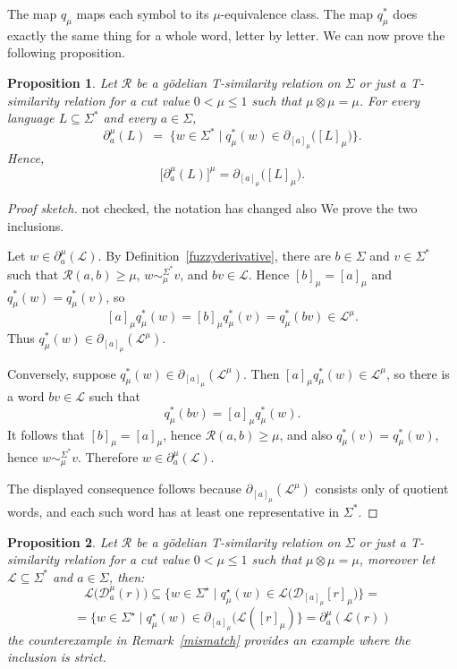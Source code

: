 \documentclass{article}
\newcommand{\cR}{{\mathcal R}}
\def\cut{\mu}
\newtheorem{proposition}{Proposition}[section]
\begin{document}
\noindent
The map $q_\cut$ maps each symbol to its $\cut$-equivalence class. The map
$q_\cut^*$ does exactly the same thing for a whole word, letter by letter. We can now prove the following proposition.



\begin{proposition}\label{the:quotient-fuzzy-derivative}
Let $\cR$ be a g\"odelian T-similarity relation on $\Sigma$ or just a T-similarity relation for a cut value $0 < \cut \le 1$ such that $\mu\otimes\mu=\mu$. For every language $L \subseteq \Sigma^*$ and every
$a\in\Sigma$,
\[
  \partial_a^\cut( L)
  \;=\;
  \{w\in\Sigma^* \mid q_\cut^*(w)\in
       \partial_{[a]_\cut}\bigl( [L]_\cut \bigr)\}.
\]
Hence,
\[
  \bigl[\partial_a^\cut( L)\bigr]^\mu
  =
  \partial_{[a]_\cut}\bigl( [L]_\cut \bigr).
\]
\end{proposition}

\begin{proof}[Proof sketch]{\color{red} not checked, the notation has changed also}
We prove the two inclusions.

Let $w\in\partial_a^\cut(\mathcal L)$. By Definition~\ref{fuzzyderivative},
there are $b\in\Sigma$ and $v\in\Sigma^*$ such that $\cR(a,b)\ge\cut$,
$w\sim_\cut^{\Sigma^*}v$, and $bv\in\mathcal L$. Hence
$[b]_\cut=[a]_\cut$ and $q_\cut^*(w)=q_\cut^*(v)$, so
\[
  [a]_\cut q_\cut^*(w)
  =
  [b]_\cut q_\cut^*(v)
  =
  q_\cut^*(bv)
  \in \mathcal L^\cut.
\]
Thus $q_\cut^*(w)\in\partial_{[a]_\cut}(\mathcal L^\cut)$.

Conversely, suppose $q_\cut^*(w)\in\partial_{[a]_\cut}(\mathcal L^\cut)$. Then
$[a]_\cut q_\cut^*(w)\in\mathcal L^\cut$, so there is a word $bv\in\mathcal L$
such that
\[
  q_\cut^*(bv)=[a]_\cut q_\cut^*(w).
\]
It follows that $[b]_\cut=[a]_\cut$, hence $\cR(a,b)\ge\cut$, and also
$q_\cut^*(v)=q_\cut^*(w)$, hence $w\sim_\cut^{\Sigma^*}v$. Therefore
$w\in\partial_a^\cut(\mathcal L)$.

The displayed consequence follows because
$\partial_{[a]_\cut}(\mathcal L^\cut)$ consists only of quotient words, and each
such word has at least one representative in $\Sigma^*$.
\end{proof}

{\color{red}\begin{proposition} 
Let $\cR$ be a g\"odelian T-similarity relation on $\Sigma$ or just a T-similarity relation for a cut value $0 < \cut \le 1$ such that $\mu\otimes\mu=\mu$, moreover let $\mathcal{L}\subseteq\Sigma^*$ and $a\in\Sigma$, then:
\[
 \mathcal L\bigl(\mathcal D_a^\cut( r)\bigr)
  \subseteq
 \{w\in \Sigma^\star \mid q^\star_\mu(w)\in \mathcal L\bigl(\mathcal D_{[a]_\cut} [r]_\mu\bigr)\}= \]
\[=\{w\in \Sigma^\star \mid q^\star_\mu(w)\in \partial_{[a]_\mu}(\mathcal L([r]_\mu)\}= \partial_a^\mu(\mathcal L(r))\]
the counterexample in Remark~\ref{mismatch} provides an example where the inclusion is strict. 
\end{proposition}}\vspace{1cm}
\end{document}

